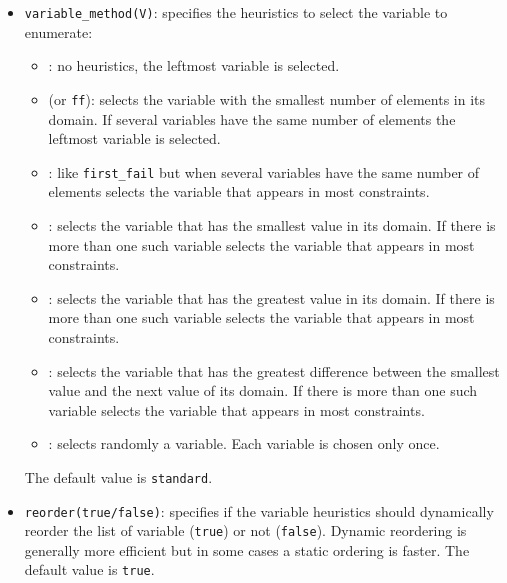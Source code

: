 \begin{itemize}

\item {}\texttt{variable\_method(V)}: specifies the
heuristics to select the variable to enumerate:

\begin{itemize}

\item {}: no heuristics, the leftmost variable is selected.

\item {} (or \texttt{ff}): selects the variable with the
smallest number of elements in its domain. If several variables have the
same number of elements the leftmost variable is selected.

\item {}: like \texttt{first\_fail} but when
several variables have the same number of elements selects the
variable that appears in most constraints.

\item {}: selects the variable that has the smallest value
in its domain. If there is more than one such variable selects the
variable that appears in most constraints.

\item {}: selects the variable that has the greatest value in
its domain. If there is more than one such variable selects the variable
that appears in most constraints.

\item {}: selects the variable that has the greatest
difference between the smallest value and the next value of its domain. If
there is more than one such variable selects the variable that appears in
most constraints.

\item {}: selects randomly a variable. Each variable is 
chosen only once.

\end{itemize}

\BL The default value is \texttt{standard}.

\item {}\texttt{reorder(true/false)}: specifies if the variable
heuristics should dynamically reorder the list of variable (\texttt{true}) or
not (\texttt{false}). Dynamic reordering is generally more efficient but in
some cases a static ordering is faster. The default value is
\texttt{true}.


\end{itemize}
